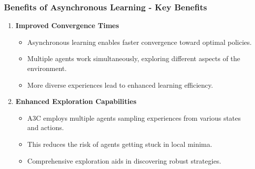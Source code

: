 \documentclass{beamer}
\begin{document}
\begin{frame}[fragile]
    \frametitle{Benefits of Asynchronous Learning - Key Benefits}
    \begin{enumerate}
        \item \textbf{Improved Convergence Times}
        \begin{itemize}
            \item Asynchronous learning enables faster convergence toward optimal policies.
            \item Multiple agents work simultaneously, exploring different aspects of the environment.
            \item More diverse experiences lead to enhanced learning efficiency.
        \end{itemize}

        \item \textbf{Enhanced Exploration Capabilities}
        \begin{itemize}
            \item A3C employs multiple agents sampling experiences from various states and actions.
            \item This reduces the risk of agents getting stuck in local minima.
            \item Comprehensive exploration aids in discovering robust strategies.
        \end{itemize}
    \end{enumerate}
\end{frame}
\end{document}
